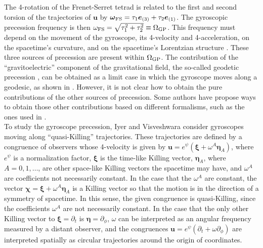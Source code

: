 \documentclass[12pt]{article}
\def\wfs{\mbi{\omega}_{\rm FS}}
\newcommand{\mbi}[1]{\boldsymbol{#1}}    %
\begin{document}
The 4-rotation of the Frenet-Serret tetrad is related to the first and second torsion of the trajectories of $\mbi{u}$ by $\wfs=\tau_1 \mbi{e}_{(3)}+\tau_2\mbi{e}_{(1)}$. The gyroscopic precession frequency is then $\omega_{\rm FS}=\sqrt{\tau_1^2+\tau_2^2}\equiv \Omega_{\rm GP}$. This frequency must depend on the movement of the gyroscope, its 4-velocity and 4-acceleration, on the spacetime's curvature, and on the spacetime's Lorentzian structure \cite{semerak1996forces}. These three sources of precession are present within $\Omega_{\rm GP}$. The contribution of the ``gravitoelectric'' component of the gravitational field, the so-called geodetic precession \cite{semerak1996forces}, can be obtained as a limit case in which the gyroscope moves along a geodesic, as shown in \cite{mukherjee2018horndeski, majumder2025gyroscopic}. However, it is not clear how to obtain the pure contributions of the other sources of precession. Some authors have propose ways to obtain those other contributions based on different formalisms, such as the ones used in \cite{semerak1996forces, mirza2023class}.\\

To study the gyroscope precession, Iyer and Visveshwara \cite{iyer1993frenet} consider gyroscopes moving along ``quasi-Killing'' trajectories. These trajectories are defined by a congruence of observers whose 4-velocity is given by $\mbi{u}=e^{\psi}(\mbi{\xi}+\omega^{A}\mbi{\eta}_{A})$, where $e^{\psi}$ is a normalization factor, $\mbi{\xi}$ is the time-like Killing vector, $\mbi{\eta}_A$, where $A=0,1,\dots$, are other space-like Killing vectors the spacetime may have, and $\omega^{A}$ are coefficients not necessarily constant. In the case that the $\omega^A$ are constant, the vector $\mbi{\chi}=\mbi{\xi}+\omega^{A}\mbi{\eta}_{A}$ is a Killing vector so that the motion is in the direction of a symmetry of spacetime. In this sense, the given congruence is quasi-Killing, since the coefficients $\omega^A$ are not necessarily constant. In the case that the only other Killing vector to $\mbi{\xi}=\partial_t$ is $\mbi{\eta}=\partial_\phi$, $\omega$ can be interpreted as an angular frequency measured by a distant observer, and the congruences $\mbi{u}=e^{\psi}(\partial_t+\omega\partial_\phi)$ are interpreted spatially as circular trajectories around the origin of coordinates.

\end{document}
